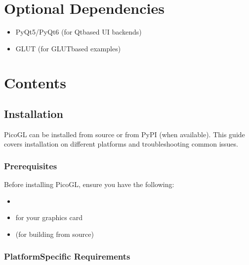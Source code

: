 \documentclass[a4paper,10pt,english,openany,oneside]{sphinxmanual}
\begin{document}
\chapter{Optional Dependencies}
\label{\detokenize{index:optional-dependencies}}\begin{itemize}
\item {} 
\sphinxAtStartPar
PyQt5/PyQt6 (for Qt\sphinxhyphen{}based UI backends)

\item {} 
\sphinxAtStartPar
GLUT (for GLUT\sphinxhyphen{}based examples)

\end{itemize}


\chapter{Contents}
\label{\detokenize{index:contents}}
\sphinxstepscope


\section{Installation}
\label{\detokenize{installation:installation}}\label{\detokenize{installation::doc}}
\sphinxAtStartPar
PicoGL can be installed from source or from PyPI (when available). This guide covers installation on different platforms and troubleshooting common issues.


\subsection{Prerequisites}
\label{\detokenize{installation:prerequisites}}
\sphinxAtStartPar
Before installing PicoGL, ensure you have the following:
\begin{itemize}
\item {} 
\sphinxAtStartPar
{}

\item {} 
\sphinxAtStartPar
{} for your graphics card

\item {} 
\sphinxAtStartPar
{} (for building from source)

\end{itemize}


\subsection{Platform\sphinxhyphen{}Specific Requirements}
\label{\detokenize{installation:platform-specific-requirements}}
\end{document}
